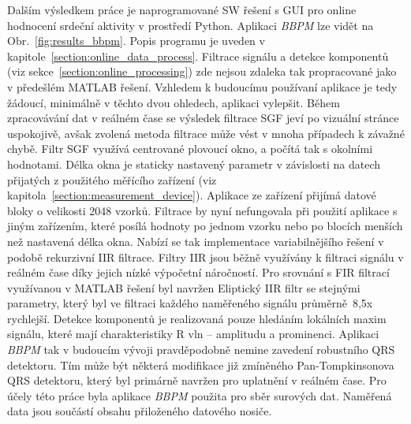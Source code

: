 Dalším výsledkem práce je naprogramované SW řešení s GUI pro online hodnocení
srdeční aktivity v prostředí Python. Aplikaci \textit{BBPM} lze vidět
na Obr.~\ref{fig:results_bbpm}. Popis programu je uveden v
kapitole~\ref{section:online_data_process}. Filtrace signálu a detekce
komponentů (viz sekce~\ref{section:online_processing}) zde nejsou zdaleka tak
propracované jako v předešlém MATLAB řešení. Vzhledem k budoucímu
používaní aplikace je tedy žádoucí, minimálně v těchto dvou ohledech, aplikaci
vylepšit. Během zpracovávání dat v reálném čase se výsledek filtrace SGF jeví po
vizuální stránce uspokojivě, avšak zvolená metoda filtrace může vést v mnoha
případech k závažné chybě. Filtr SGF využívá centrované plovoucí okno, a počítá
tak s okolními hodnotami. Délka okna je staticky nastavený parametr v závislosti
na datech přijatých z použitého měřícího zařízení (viz
kapitola~\ref{section:measurement_device}). Aplikace ze zařízení přijímá datové
bloky o velikosti 2048 vzorků. Filtrace by nyní nefungovala při použití aplikace
s jiným zařízením, které posílá hodnoty po jednom vzorku nebo po blocích menších
než nastavená délka okna. Nabízí se tak implementace variabilnějšího řešení v
podobě rekurzivní IIR filtrace. Filtry IIR jsou běžně využívány k filtraci
signálu v reálném čase díky jejich nízké výpočetní náročností. Pro
srovnání s FIR filtrací využívanou v MATLAB řešení byl navržen
Eliptický IIR filtr se stejnými parametry, který byl ve filtraci každého
naměřeného signálu průměrně~8,5x rychlejší. Detekce komponentů je realizovaná
pouze hledáním lokálních maxim signálu, které mají charakteristiky R vln --
amplitudu a prominenci. Aplikaci \textit{BBPM} tak v budoucím vývoji
pravděpodobně nemine zavedení robustního QRS detektoru. Tím může být některá
modifikace již zmíněného Pan-Tompkinsonova QRS detektoru, který byl primárně
navržen pro uplatnění v reálném čase. Pro účely této práce byla aplikace
\textit{BBPM} použita pro sběr surových dat. Naměřená data jsou součástí obsahu
přiloženého datového nosiče.

